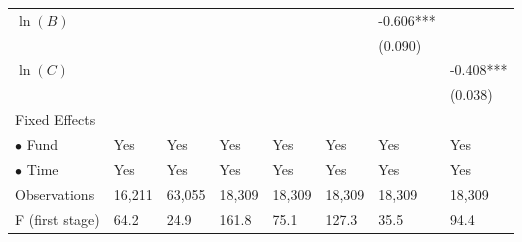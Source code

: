 \documentclass[openany]{book}
\theoremstyle{definition}
\theoremstyle{definition}
\theoremstyle{definition}
\theoremstyle{remark}
\begin{document}
\begin{table}[ht]
\begin{tabularx}{0.975\textwidth}{lYYYYYYY}
  $\ln(B)$ &  &  &  &  &  & -0.606*** &  \\ 
   &  &  &  &  &  & (0.090) &  \\ 
  $\ln(C)$ &  &  &  &  &  &  & -0.408*** \\ 
   &  &  &  &  &  &  & (0.038) \\ 
  Fixed Effects &  &  &  &  &  &  &  \\ 
  $\bullet$ Fund & Yes & Yes & Yes & Yes & Yes & Yes & Yes \\ 
  $\bullet$ Time & Yes & Yes & Yes & Yes & Yes & Yes & Yes \\ 
  Observations & 16,211 & 63,055 & 18,309 & 18,309 & 18,309 & 18,309 & 18,309 \\ 
  F (first stage) & 64.2 & 24.9 & 161.8 & 75.1 & 127.3 & 35.5 & 94.4 \\ 
   \bottomrule
\end{tabularx}
\endgroup
\end{table}
\end{document}

